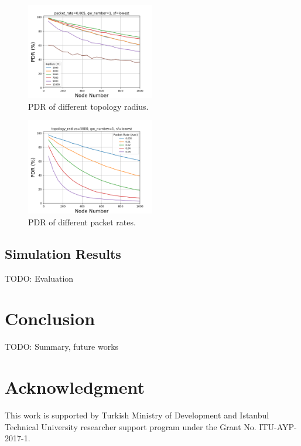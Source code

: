 \documentclass[conference]{IEEEtran}
\begin{document}
\begin{figure}
\centering
\includegraphics[width=0.5\textwidth]{r_pdr}
\caption{PDR of different topology radius.}
\label{fig:sf_10000}
\end{figure}

\begin{figure}
\centering
\includegraphics[width=0.5\textwidth]{pr_pdr}
\caption{PDR of different packet rates.}
\label{fig:sf_10000}
\end{figure}

\subsection{Simulation Results}
TODO: Evaluation


\section{Conclusion} \label{Conclusion}
TODO: Summary, future works
\cite{7815384} \cite{7803607} \cite{7996384} \cite{8090518} \cite{s17061193} \cite{8267219} \cite{8430542} \cite{8319183} \cite{8480649} \cite{AN1200.22} \cite{Bor:2016:LLW:2988287.2989163} \cite{8406255} \cite{DBLP:journals/corr/abs-1802-10338} \cite{finnegan2018comparative}


\section*{Acknowledgment}
This work is supported by Turkish Ministry of Development and Istanbul Technical University researcher support program under the Grant No. ITU-AYP-2017-1.




\end{document}
